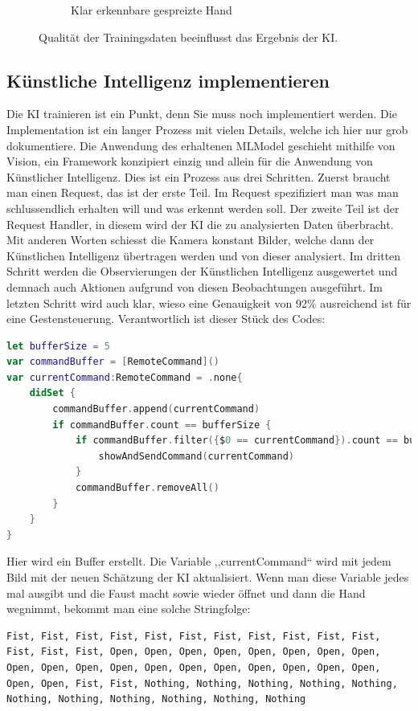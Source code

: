 \documentclass[12pt]{article}
\begin{document}
\begin{figure}
\begin{subfigure}[b]{0.475\textwidth}
            \caption[]%
            {{\small Klar erkennbare gespreizte Hand}}    
            \label{fig:klaroffen}
        \end{subfigure}
        \caption[]
        {\small Qualität der Trainingsdaten beeinflusst das Ergebnis der KI.} 
        \label{fig:qualityoftraining}
    \end{figure}
\newpage
\subsection{Künstliche Intelligenz implementieren}
Die KI trainieren ist ein Punkt, denn Sie muss noch implementiert werden. Die Implementation ist ein langer Prozess mit vielen Details, welche ich hier nur grob dokumentiere. Die Anwendung des erhaltenen MLModel geschieht mithilfe von Vision, ein Framework konzipiert einzig und allein für die Anwendung von Künstlicher Intelligenz. Dies ist ein Prozess aus drei Schritten. Zuerst braucht man einen Request, das ist der erste Teil. Im Request spezifiziert man was man schlussendlich erhalten will und was erkennt werden soll. Der zweite Teil ist der Request Handler, in diesem wird der KI die zu analysierten Daten überbracht. Mit anderen Worten schiesst die Kamera konstant Bilder, welche dann der Künstlichen Intelligenz übertragen werden und von dieser analysiert. Im dritten Schritt werden die Observierungen der Künstlichen Intelligenz ausgewertet und demnach auch Aktionen aufgrund von diesen Beobachtungen ausgeführt. \cite{gesturecontrolvideo} Im letzten Schritt wird auch klar, wieso eine Genauigkeit von 92\% ausreichend ist für eine Gestensteuerung. Verantwortlich ist dieser Stück des Codes: 
\begin{lstlisting}[language=Swift,caption={KI Buffer},label={lst:buffer}]
let bufferSize = 5
var commandBuffer = [RemoteCommand]()
var currentCommand:RemoteCommand = .none{
    didSet {
        commandBuffer.append(currentCommand)
        if commandBuffer.count == bufferSize {
            if commandBuffer.filter({$0 == currentCommand}).count == bufferSize{
                showAndSendCommand(currentCommand)
            }
            commandBuffer.removeAll()
        }
    }
}
\end{lstlisting}
Hier wird ein Buffer erstellt. Die Variable ,,currentCommand`` wird mit jedem Bild mit der neuen Schätzung der KI aktualisiert. Wenn man diese Variable jedes mal ausgibt und die Faust macht sowie wieder öffnet und dann die Hand wegnimmt, bekommt man eine solche Stringfolge:
\begin{lstlisting}[caption={Output KI-Resultate},label={lst:outputKI}]
Fist, Fist, Fist, Fist, Fist, Fist, Fist, Fist, Fist, Fist, Fist, Fist, Fist, Fist, Open, Open, Open, Open, Open, Open, Open, Open, Open, Open, Open, Open, Open, Open, Open, Open, Open, Open, Open, Open, Open, Fist, Fist, Nothing, Nothing, Nothing, Nothing, Nothing, Nothing, Nothing, Nothing, Nothing, Nothing, Nothing
\end{lstlisting}
\end{document}
